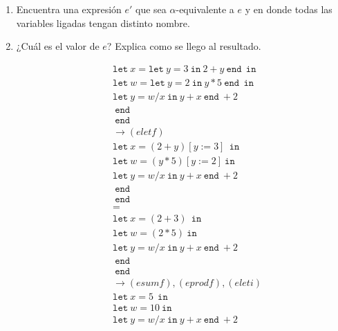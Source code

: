 \documentclass{article}
\begin{document}
\begin{enumerate}
{\begin{enumerate}
{        	}
        	\item{
        	Encuentra una expresión $e'$ que sea $\alpha$-equivalente a $e$ y en donde todas las variables ligadas tengan distinto nombre.\\
        	
        	}
        	\item {
            ¿Cuál es el valor de $e$? Explica como se llego al resultado.
            
            \begin{align*}
                &\texttt{let} \ x = \texttt{let} \ y = 3 \ \texttt{in} \ 2 + y \ \texttt{end} \  \ \texttt{in} \\\
                &\texttt{let} \ w = \texttt{let} \ y = 2 \ \texttt{in} \ y * 5 \ \texttt{end} \  \ \texttt{in} \\\
                &\texttt{let} \ y = w / x \ \texttt{in} \ y + x \ \texttt{end} \  + 2\\
                &\ \texttt{end} \ \\
                &\ \texttt{end} \ \\
                &\rightarrow (eletf) \\
                &\texttt{let} \ x = (2 + y)[y:=3] \ \ \texttt{in} \\
                &\texttt{let} \ w =  (y * 5)[y:=2] \ \texttt{in} \\
                &\texttt{let} \ y = w / x \ \texttt{in} \ y + x \ \texttt{end} \  + 2\\
                &\ \texttt{end} \ \\
                &\ \texttt{end} \ \\
                &= \\
                &\texttt{let} \ x = (2 + 3) \ \ \texttt{in} \\
                &\texttt{let} \ w =  (2 * 5) \ \texttt{in} \\
                &\texttt{let} \ y = w / x \ \texttt{in} \ y + x \ \texttt{end} \  + 2\\
                &\ \texttt{end} \ \\
                &\ \texttt{end} \ \\
                &\rightarrow (esumf), (eprodf), (eleti) \\
                &\texttt{let} \ x = 5 \ \ \texttt{in} \\
                &\texttt{let} \ w =  10 \ \texttt{in} \\
                &\texttt{let} \ y = w / x \ \texttt{in} \ y + x \ \texttt{end} \  + 2\\

\end{align*}}
\end{enumerate}}
\end{enumerate}
\end{document}
